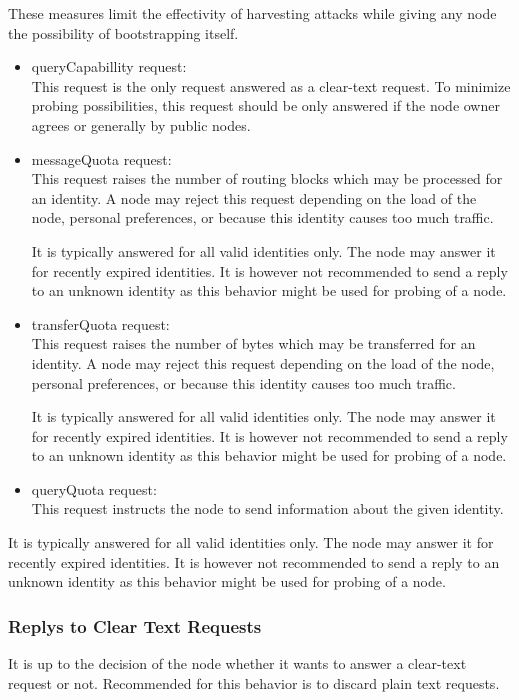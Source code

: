 These measures limit the effectivity of harvesting attacks while giving any node the possibility of bootstrapping itself.

\begin{itemize}
	\item queryCapabillity request:\\
	This request is the only request answered as a clear-text request. To minimize probing possibilities, this request should be only answered if the node owner agrees or generally by public nodes.
	
	\item messageQuota request:\\ 
	This request raises the number of routing blocks which may be processed for an identity. A node may reject this request depending on the load of the node, personal preferences, or because this identity causes too much traffic.
	
	It is typically answered for all valid identities only. The node may answer it for recently expired identities. It is however not recommended to send a reply to an unknown identity as this behavior might be used for probing of a node.
	
	\item transferQuota request:\\
	This request raises the number of bytes which may be transferred for an identity. A node may reject this request depending on the load of the node, personal preferences, or because this identity causes too much traffic.
	
	It is typically answered for all valid identities only. The node may answer it for recently expired identities. It is however not recommended to send a reply to an unknown identity as this behavior might be used for probing of a node.
	
	\item queryQuota request:\\
	This request instructs the node to send information about the given identity.
\end{itemize}

It is typically answered for all valid identities only. The node may answer it for recently expired identities. It is however not recommended to send a reply to an unknown identity as this behavior might be used for probing of a node.

\subsubsection{Replys to Clear Text Requests}
It is up to the decision of the node whether it wants to answer a clear-text request or not. Recommended for this behavior is to discard plain text requests. 

